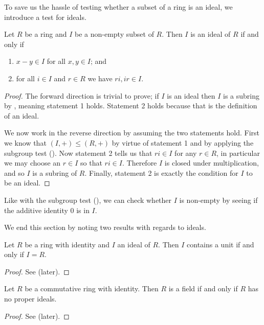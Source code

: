 To save us the hassle of testing whether a subset of a ring is an ideal, we introduce a test for ideals.
\begin{theorem}\label{thrm-test-for-ideal}
    Let $R$ be a ring and $I$ be a non-empty subset of $R$. Then $I$ is an ideal of $R$ if and only if
    \begin{enumerate}
        \item $x - y \in I$ for all $x, y \in I$; and
        \item for all $i \in I$ and $r \in R$ we have $ri, ir \in I$.
    \end{enumerate}
\end{theorem}
\begin{proof}
    The forward direction is trivial to prove; if $I$ is an ideal then $I$ is a subring by , meaning statement 1 holds. Statement 2 holds because that is the definition of an ideal.

    We now work in the reverse direction by assuming the two statements hold. First we know that $(I,+) \leq (R,+)$ by virtue of statement 1 and by applying the subgroup test (). Now statement 2 tells us that $ri \in I$ for any $r \in R$, in particular we may choose an $r \in I$ so that $ri \in I$. Therefore $I$ is closed under multiplication, and so $I$ is a subring of $R$. Finally, statement 2 is exactly the condition for $I$ to be an ideal.
\end{proof}
\begin{remark}
    Like with the subgroup test (), we can check whether $I$ is non-empty by seeing if the additive identity 0 is in $I$.
\end{remark}

We end this section by noting two results with regards to ideals.
\begin{proposition}\label{prop-ideal-contains-unit-iff-ideal-is-whole-ring}
    Let $R$ be a ring with identity and $I$ an ideal of $R$. Then $I$ contains a unit if and only if $I = R$.
\end{proposition}
\begin{proof}
    See  (later).
\end{proof}

\begin{proposition}\label{prop-ring-is-field-iff-no-proper-ideals}
    Let $R$ be a commutative ring with identity. Then $R$ is a field if and only if $R$ has no proper ideals.
\end{proposition}
\begin{proof}
    See  (later).
\end{proof}

